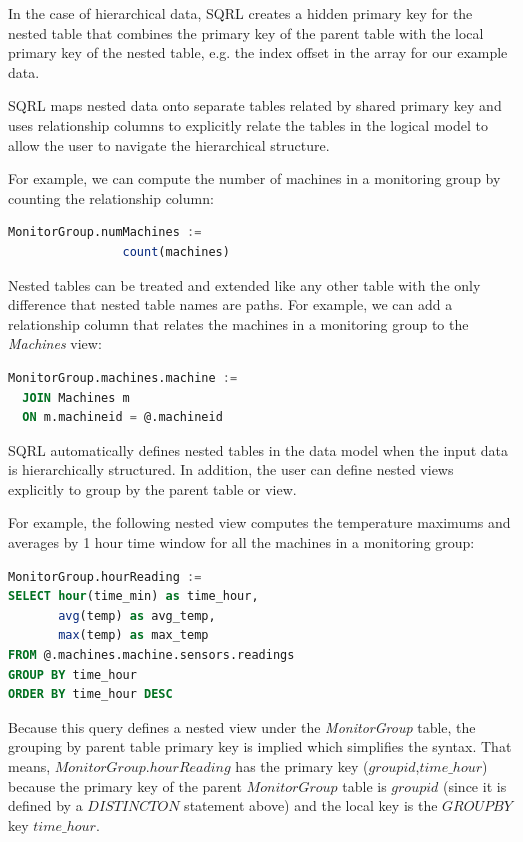 \documentclass[	DIV=calc,%
							paper=letter,%
							fontsize=11pt,%
							twocolumn]{scrartcl}	 					%
\begin{document}
In the case of hierarchical data, SQRL creates a hidden primary key for the nested table that combines the primary key of the parent table with the local primary key of the nested table, e.g. the index offset in the array for our example data.

SQRL maps nested data onto separate tables related by shared primary key and uses relationship columns to explicitly relate the tables in the logical model to allow the user to navigate the hierarchical structure.

For example, we can compute the number of machines in a monitoring group by counting the relationship column:
\begin{lstlisting}[language=SQL]
MonitorGroup.numMachines :=
                count(machines)
\end{lstlisting}

Nested tables can be treated and extended like any other table with the only difference that nested table names are paths. For example, we can add a relationship column that relates the machines in a monitoring group to the \emph{Machines} view:
\begin{lstlisting}[language=SQL]
MonitorGroup.machines.machine :=
  JOIN Machines m
  ON m.machineid = @.machineid
\end{lstlisting}

SQRL automatically defines nested tables in the data model when the input data is hierarchically structured. In addition, the user can define nested views explicitly to group by the parent table or view.

For example, the following nested view computes the temperature maximums and averages by 1 hour time window for all the machines in a monitoring group:
\begin{lstlisting}[language=SQL]
MonitorGroup.hourReading :=
SELECT hour(time_min) as time_hour,
       avg(temp) as avg_temp,
       max(temp) as max_temp
FROM @.machines.machine.sensors.readings
GROUP BY time_hour
ORDER BY time_hour DESC
\end{lstlisting}

Because this query defines a nested view under the \emph{MonitorGroup} table, the grouping by parent table primary key is implied which simplifies the syntax. That means, $MonitorGroup.hourReading$ has the primary key ($groupid$,$time\_hour$) because the primary key of the parent $MonitorGroup$ table is $groupid$ (since it is defined by a $DISTINCT ON$ statement above) and the local key is the $GROUP BY$ key $time\_hour$.
\end{document}
